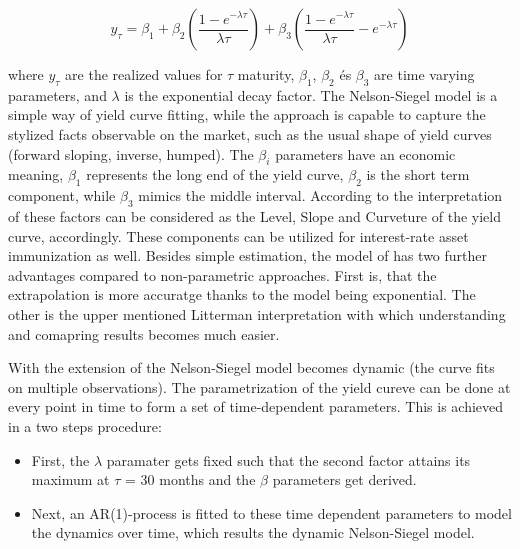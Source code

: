 \documentclass[12pt,bibliography=totoc]{article}
\begin{document}
\begin{equation}
y_{\tau}=\beta_{1}+\beta_{2}\left ( \frac{1-e^{-\lambda\tau}}{\lambda\tau} \right )+\beta_{3}\left ( \frac{1-e^{-\lambda\tau}}{\lambda\tau} -e^{-\lambda\tau}\right )
\end{equation}


where $y_{\tau}$ are the realized values for $\tau$ maturity, $\beta_{1}$, $\beta_{2}$ és $\beta_{3}$ are time varying parameters, and $\lambda$ is the exponential decay factor.
The Nelson-Siegel model is a simple way of yield curve fitting, while the approach is capable to capture the stylized facts observable on the market, such as the usual shape of yield curves (forward sloping, inverse, humped).
The $\beta_{i}$ parameters have an economic meaning, $\beta_{1}$ represents the long end of the yield curve,  $\beta_{2}$ is the short term component, while $\beta_{3}$ mimics the middle interval. According to the interpretation of \cite{litterman1991common} these factors can be considered as the Level, Slope and Curveture of the yield curve, accordingly. These components can be utilized for interest-rate asset immunization as well. Besides simple estimation, the model of \cite{diebold2006forecasting} has two further advantages compared to non-parametric approaches. First is, that the extrapolation is more accuratge thanks to the model being exponential. The other is the upper mentioned Litterman interpretation with which understanding and comapring results becomes much easier.
 
With the extension of \cite{diebold2006forecasting} the Nelson-Siegel model becomes dynamic (the curve fits on multiple observations). The parametrization of the yield cureve can be done at every point in time
to form a set of time-dependent parameters. This is achieved in a two steps procedure:
\begin{itemize}
\item First, the $\lambda$  paramater gets fixed such that the second factor attains its maximum at $\tau$ = 30 months and the $\beta$ parameters get derived.
\item Next, an AR(1)-process is fitted to these time dependent parameters to model the dynamics over time, which results the dynamic Nelson-Siegel model.
\end{itemize}
\end{document}
